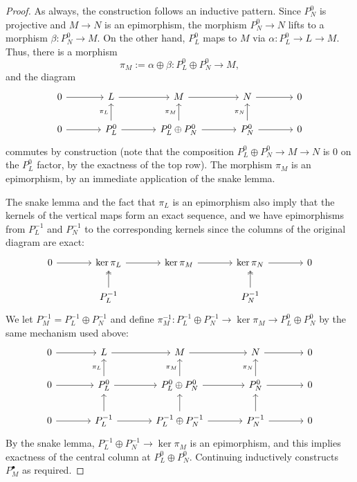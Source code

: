\begin{proof}
  As always, the construction follows an inductive pattern. Since
  $P_N^0$ is projective and $M \to N$ is an epimorphism, the morphism
  $P_N^0 \to N$ lifts to a morphism $\beta : P_N^0 \to M$. On the
  other hand, $P_L^0$ maps to $M$ via $\alpha : P_L^0 \to L \to M$.
  Thus, there is a morphism
  \[
    \pi_M := \alpha \oplus \beta : P_L^0 \oplus P_N^0 \longrightarrow
    M,
  \]
  and the diagram
  \[\begin{tikzcd}[column sep=large]
      0 \arrow[r] & L \arrow[r] & M \arrow[r] & N \arrow[r] & 0 \\
      0 \arrow[r] & P_L^0 \arrow[u, "\pi_L"] \arrow[r] & P_L^0 \oplus
      P_N^0 \arrow[u, "\pi_M"] \arrow[r] & P_N^0 \arrow[u, "\pi_N"]
      \arrow[r] & 0
    \end{tikzcd}\] commutes by construction (note that the composition
  $P_L^0 \oplus P_N^0 \to M \to N$ is $0$ on the $P_L^0$ factor, by
  the exactness of the top row). The morphism $\pi_M$ is an
  epimorphism, by an immediate application of the snake lemma.

  The snake lemma and the fact that $\pi_L$ is an epimorphism also
  imply that the kernels of the vertical maps form an exact sequence,
  and we have epimorphisms from $P_L^{-1}$ and $P_N^{-1}$ to the
  corresponding kernels since the columns of the original diagram are
  exact:
  \[\begin{tikzcd}[column sep=large]
      0 \arrow[r] & \ker\pi_L \arrow[r] & \ker\pi_M \arrow[r] &
      \ker\pi_N \arrow[r] & 0 \\
      & P_L^{-1} \arrow[u, twoheadrightarrow] & & P_N^{-1} \arrow[u,
      twoheadrightarrow] &
    \end{tikzcd}\] We let $P_M^{-1} = P_L^{-1} \oplus P_N^{-1}$ and
  define
  $\pi_M^{-1} : P_L^{-1} \oplus P_N^{-1} \to \ker\pi_M \to P_L^0
  \oplus P_N^0$ by the same mechanism used above:
  \[\begin{tikzcd}[column sep=large]
      0 \arrow[r] & L \arrow[r] & M \arrow[r] & N \arrow[r] & 0 \\
      0 \arrow[r] & P_L^0 \arrow[u, "\pi_L"] \arrow[r] & P_L^0 \oplus
      P_N^0 \arrow[u, "\pi_M"] \arrow[r] &
      P_N^0 \arrow[u, "\pi_N"] \arrow[r] & 0 \\
      0 \arrow[r] & P_L^{-1} \arrow[u] \arrow[r] & P_L^{-1} \oplus
      P_N^{-1} \arrow[u] \arrow[r] & P_N^{-1} \arrow[u] \arrow[r] & 0
    \end{tikzcd}\] By the snake lemma,
  $P_L^{-1} \oplus P_N^{-1} \to \ker\pi_M$ is an epimorphism, and this
  implies exactness of the central column at $P_L^0 \oplus
  P_N^0$. Continuing inductively constructs $P_M^\bullet$ as required.
\end{proof}

